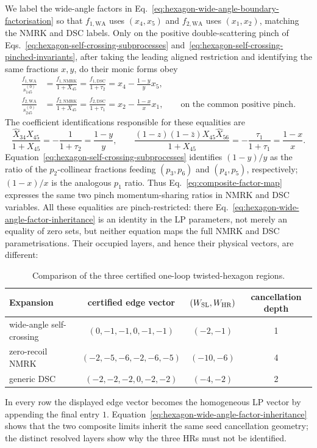 \documentclass[a4paper,11pt]{article}
\newcommand{\WSL}{W_{\rm SL}}
\newcommand{\WHR}{W_{\rm HR}}
\begin{document}
We label the wide-angle factors in
Eq.~\eqref{eq:hexagon-wide-angle-boundary-factorisation} so that
\(f_{1,\mathrm{WA}}\) uses \((x_4,x_5)\) and \(f_{2,\mathrm{WA}}\) uses
\((x_1,x_2)\), matching the NMRK and DSC labels.  Only on the positive
double-scattering pinch of
Eqs.~\eqref{eq:hexagon-self-crossing-subprocesses}
and~\eqref{eq:hexagon-self-crossing-pinched-invariants}, after taking the
leading aligned restriction and identifying the same fractions \(x,y\), do
their monic forms obey
\begin{align}
 \frac{f_{1,\mathrm{WA}}}{s_{145}^{(0)}}
 &=\frac{f_{1,\mathrm{NMRK}}}{1+X_{45}}
  =\frac{f_{1,\mathrm{DSC}}}{1+\tau_2}
  =x_4-\frac{1-y}{y}x_5,
 \nonumber\\
 \frac{f_{2,\mathrm{WA}}}{s_{245}^{(0)}}
 &=\frac{f_{2,\mathrm{NMRK}}}{1+X_{45}}
  =\frac{f_{2,\mathrm{DSC}}}{1+\tau_1}
  =x_2-\frac{1-x}{x}x_1,
 \qquad\text{on the common positive pinch.}
 \label{eq:hexagon-wide-angle-factor-inheritance}
\end{align}
The coefficient identifications responsible for these equalities are
\begin{equation}
 \frac{\widehat X_{34}X_{45}}{1+X_{45}}
 =-\frac{1}{1+\tau_2}=\frac{1-y}{y},
 \qquad
 \frac{(1-z)(1-\bar z)X_{45}\widehat X_{56}}{1+X_{45}}
 =-\frac{\tau_1}{1+\tau_1}=\frac{1-x}{x}.
 \label{eq:composite-factor-map}
\end{equation}
Equation~\eqref{eq:hexagon-self-crossing-subprocesses} identifies \((1-y)/y\)
as the ratio of the \(p_2\)-collinear fractions feeding \((p_3,p_6)\) and
\((p_4,p_5)\), respectively; \((1-x)/x\) is the analogous \(p_1\) ratio.
Thus Eq.~\eqref{eq:composite-factor-map} expresses the same two pinch
momentum-sharing ratios in NMRK and DSC variables.  All these equalities are
pinch-restricted: there Eq.~\eqref{eq:hexagon-wide-angle-factor-inheritance}
is an identity in the LP parameters, not merely an equality of zero sets, but
neither equation maps the full NMRK and DSC parametrisations.
Their occupied layers, and hence their physical vectors, are different:
\begin{table}[H]
\centering
\begin{tabular}{@{}lccc@{}}
\toprule
Expansion & certified edge vector & \((\WSL,\WHR)\) & cancellation depth\\
\midrule
wide-angle self-crossing & \((0,-1,-1,0,-1,-1)\) & \((-2,-1)\) & 1\\
zero-recoil NMRK & \((-2,-5,-6,-2,-6,-5)\) & \((-10,-6)\) & 4\\
generic DSC & \((-2,-2,-2,0,-2,-2)\) & \((-4,-2)\) & 2\\
\bottomrule
\end{tabular}
\caption{Comparison of the three certified one-loop twisted-hexagon regions.}
\label{tab:twisted-hexagon-one-loop-comparison}
\end{table}
In every row the displayed edge vector becomes the homogeneous LP vector by
appending the final entry \(1\).  Equation~\eqref{eq:hexagon-wide-angle-factor-inheritance}
shows that the two composite limits inherit the same seed cancellation
geometry; the distinct resolved layers show why the three HRs must not be
identified.
\end{document}
